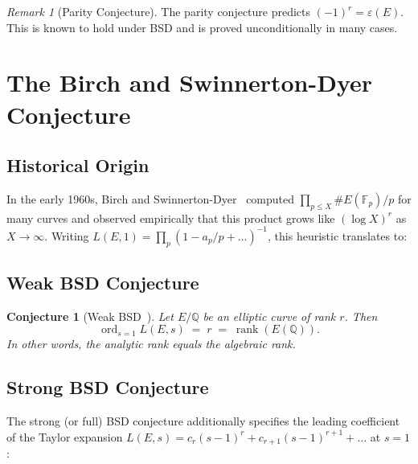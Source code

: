 \documentclass[12pt,a4paper]{article}
\newtheorem{conjecture}[theorem]{Conjecture}
\theoremstyle{remark}
\newtheorem{remark}[theorem]{Remark}
\begin{document}
\begin{remark}[Parity Conjecture]
  The parity conjecture predicts $(-1)^r = \varepsilon(E)$.  This is known to hold under
  BSD and is proved unconditionally in many cases.
\end{remark}

\section{The Birch and Swinnerton-Dyer Conjecture}

\subsection{Historical Origin}

In the early 1960s, Birch and Swinnerton-Dyer~\cite{BSD1965} computed $\prod_{p \leq X} \#E(\mathbb{F}_p)/p$
for many curves and observed empirically that this product grows like $(\log X)^r$ as
$X \to \infty$.  Writing $L(E,1) = \prod_p (1 - a_p/p + \ldots)^{-1}$, this heuristic
translates to:

\subsection{Weak BSD Conjecture}

\begin{conjecture}[Weak BSD~\cite{BSD1965,BSD1963}]
  Let $E/\mathbb{Q}$ be an elliptic curve of rank $r$.  Then
  \begin{equation}\label{eq:weakbsd}
    \operatorname{ord}_{s=1} L(E,s) \;=\; r \;=\; \operatorname{rank}(E(\mathbb{Q})).
  \end{equation}
  In other words, the analytic rank equals the algebraic rank.
\end{conjecture}

\subsection{Strong BSD Conjecture}

The strong (or full) BSD conjecture additionally specifies the leading coefficient of the
Taylor expansion $L(E,s) = c_r (s-1)^r + c_{r+1}(s-1)^{r+1} + \ldots$ at $s=1$:
\end{document}
